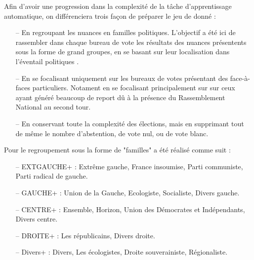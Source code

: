 \documentclass[11pt]{article}
\begin{document}
            Afin d'avoir une progression dans la complexité de la tâche d'apprentissage automatique, on différenciera trois façon de préparer le jeu de donné :
            \begin{itemize}
                \item[--] En regroupant les nuances en familles politiques. L'objectif a été ici de rassembler dans chaque bureau de vote les résultats des nuances présentents sous la forme de grand groupes, en se basant sur leur localisation dans l'éventail politiques \cite{Wikipédia_2024b}.
                \item[--] En se focalisant uniquement sur les bureaux de votes présentant des face-à-faces particuliers. Notament en se focalisant principalement sur sur ceux ayant généré beaucoup de report dû à la présence du Rassemblement National au second tour.
                \item[--] En conservant toute la complexité des élections, mais en supprimant tout de même le nombre d'abstention, de vote nul, ou de vote blanc.
            \end{itemize}

            Pour le regroupement sous la forme de "familles" a été réalisé comme suit :
            \begin{itemize}
                \item[--] EXTGAUCHE+ : Extrême gauche, France insoumise, Parti communiste, Parti radical de gauche.
                \item[--] GAUCHE+ : Union de la Gauche, Ecologiste, Socialiste, Divers gauche.
                \item[--] CENTRE+ : Ensemble, Horizon, Union des Démocrates et Indépendants, Divers centre.
                \item[--] DROITE+ : Les républicains, Divers droite.
                \item[--] Divers+ : Divers, Les écologistes, Droite souverainiste, Régionaliste.
            \end{itemize}
\end{document}
